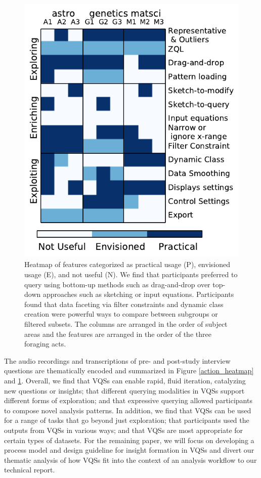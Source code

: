 \begin{figure}[ht!]
    \centering
    \includegraphics[width=0.7\columnwidth]{figures/result2.pdf}
    \vspace{-6pt}\caption{Heatmap of features categorized as practical usage (P), envisioned usage (E), and not useful (N). We find that participants preferred to query using bottom-up methods such as drag-and-drop over top-down approaches such as sketching or input equations. Participants found that data faceting via filter constraints and dynamic class creation were powerful ways to compare between subgroups or filtered subsets. The columns are arranged in the order of subject areas and the features are arranged in the order of the three foraging acts.}
    \label{feature_heatmap}
    \vspace{-5pt}
\end{figure}

\par The audio recordings and transcriptions of pre- and post-study interview questions are thematically encoded and summarized in Figure \ref{action_heatmap} and \ref{feature_heatmap}. Overall, we find that VQSs can enable rapid, fluid iteration, catalyzing new questions or insights; that different querying modalities in VQSs support different forms of exploration; and that expressive querying allowed participants to compose novel analysis patterns. In addition, we find that VQSs can be used for a range of tasks that go beyond just exploration; that participants used the outputs from VQSs in various ways; and that VQSs are most appropriate for certain types of datasets.
For the remaining paper, we will focus on developing a process model and design guideline for insight formation in VQSs and divert our thematic analysis of how VQSs fit into the context of an analysis workflow to our technical report.

